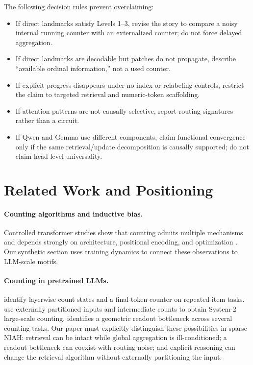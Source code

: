 \documentclass[10pt,twocolumn]{article}
\begin{document}
The following decision rules prevent overclaiming:
\begin{itemize}
\item If direct landmarks satisfy Levels 1--3, revise the story to compare a noisy internal running
counter with an externalized counter; do not force delayed aggregation.
\item If direct landmarks are decodable but patches do not propagate, describe ``available ordinal
information,'' not a used counter.
\item If explicit progress disappears under no-index or relabeling controls, restrict the claim to
targeted retrieval and numeric-token scaffolding.
\item If attention patterns are not causally selective, report routing signatures rather than a
circuit.
\item If Qwen and Gemma use different components, claim functional convergence only if the same
retrieval/update decomposition is causally supported; do not claim head-level universality.
\end{itemize}

\section{Related Work and Positioning}
\paragraph{Counting algorithms and inductive bias.}
Controlled transformer studies show that counting admits multiple mechanisms and depends strongly
on architecture, positional encoding, and optimization
\citep{golkar2024contextual,yehudai2024count,chang2025inductive,behrens2025counting}.
Our synthetic section uses training dynamics to connect these observations to LLM-scale motifs.

\paragraph{Counting in pretrained LLMs.}
\citet{hasani2026understanding} identify layerwise count states and a final-token counter on
repeated-item tasks. \citet{hasani2026system2} use externally partitioned inputs and intermediate
counts to obtain System-2 large-scale counting. \citet{garcia2026direction} identifies a geometric
readout bottleneck across several counting tasks. Our paper must explicitly distinguish these
possibilities in sparse NIAH: retrieval can be intact while global aggregation is ill-conditioned;
a readout bottleneck can coexist with routing noise; and explicit reasoning can change the
retrieval algorithm without externally partitioning the input.
\end{document}
